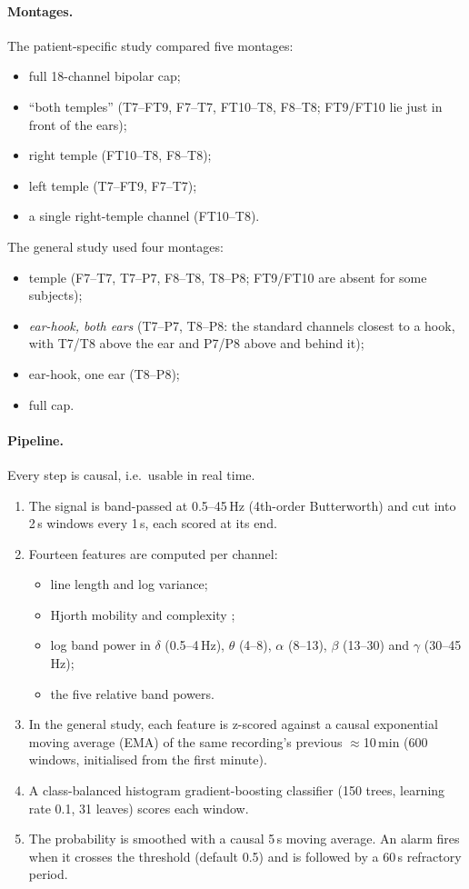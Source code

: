 \paragraph{Montages.} The patient-specific study compared five montages:
\begin{itemize}
\item full 18-channel bipolar cap;
\item ``both temples'' (T7--FT9, F7--T7, FT10--T8, F8--T8; FT9/FT10 lie just in front of the ears);
\item right temple (FT10--T8, F8--T8);
\item left temple (T7--FT9, F7--T7);
\item a single right-temple channel (FT10--T8).
\end{itemize}
The general study used four montages:
\begin{itemize}
\item temple (F7--T7, T7--P7, F8--T8, T8--P8; FT9/FT10 are absent for some subjects);
\item \emph{ear-hook, both ears} (T7--P7, T8--P8: the standard channels closest to a hook, with T7/T8 above the ear and P7/P8 above and behind it);
\item ear-hook, one ear (T8--P8);
\item full cap.
\end{itemize}

\paragraph{Pipeline.} Every step is causal, i.e.\ usable in real time.
\begin{enumerate}
\item The signal is band-passed at 0.5--45\,Hz (4th-order Butterworth) and cut into 2\,s windows every 1\,s, each scored at its end.
\item Fourteen features are computed per channel:
\begin{itemize}
\item line length \cite{esteller2001} and log variance;
\item Hjorth mobility and complexity \cite{hjorth1970};
\item log band power in $\delta$ (0.5--4\,Hz), $\theta$ (4--8), $\alpha$ (8--13), $\beta$ (13--30) and $\gamma$ (30--45\,Hz);
\item the five relative band powers.
\end{itemize}
\item In the general study, each feature is z-scored against a causal exponential moving average (EMA) of the same recording's previous $\approx$10\,min (600 windows, initialised from the first minute).
\item A class-balanced histogram gradient-boosting classifier \cite{pedregosa2011,ke2017} (150 trees, learning rate 0.1, 31 leaves) scores each window.
\item The probability is smoothed with a causal 5\,s moving average. An alarm fires when it crosses the threshold (default 0.5) and is followed by a 60\,s refractory period.
\end{enumerate}

